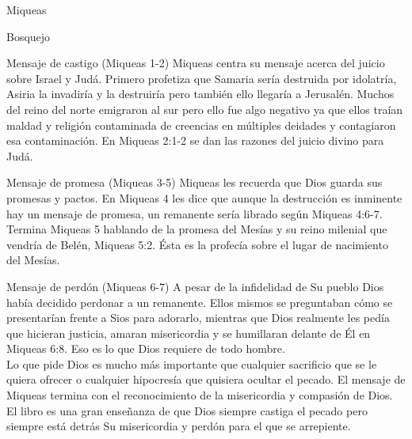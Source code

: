 \begin{section}{Miqueas}
\begin{enumerate}
	\end{enumerate}
	\begin{subsection}{Bosquejo}
		\begin{subsubsection}{Mensaje de castigo (Miqueas 1-2)}
			Miqueas centra su mensaje acerca del juicio sobre Israel y Judá. Primero profetiza que Samaria sería destruida por idolatría, Asiria la invadiría y la destruiría pero también ello llegaría a Jerusalén.
			\newpage
			Muchos del reino del norte emigraron al sur pero ello fue algo negativo ya que ellos traían maldad y religión contaminada de creencias en múltiples deidades y contagiaron esa contaminación. En Miqueas 2:1-2 se dan las razones del juicio divino para Judá. 
		\end{subsubsection}
		\begin{subsubsection}{Mensaje de promesa (Miqueas 3-5)}
			Miqueas les recuerda que Dios guarda sus promesas y pactos. En Miqueas 4 les dice que aunque la destrucción es inminente hay un mensaje de promesa, un remanente sería librado según Miqueas 4:6-7. Termina Miqueas 5 hablando de la promesa del Mesías y su reino milenial que vendría de Belén, Miqueas 5:2. Ésta es la profecía sobre el lugar de nacimiento del Mesías.
		\end{subsubsection}
		\begin{subsubsection}{Mensaje de perdón (Miqueas 6-7)}
			A pesar de la infidelidad de Su pueblo Dios había decidido perdonar a un remanente. Ellos mismos se preguntaban cómo se presentarían frente a Sios para adorarlo, mientras que Dios realmente les pedía que hicieran justicia, amaran misericordia y se humillaran delante de Él en Miqueas 6:8. Eso es lo que Dios requiere de todo hombre.\\
			Lo que pide Dios es mucho más importante que cualquier sacrificio que se le quiera ofrecer o cualquier hipocresía que quisiera ocultar el pecado. El mensaje de Miqueas termina con el reconocimiento de la misericordia y compasión de Dios. El libro es una gran enseñanza de que Dios siempre castiga el pecado pero siempre está detrás Su misericordia y perdón para el que se arrepiente.
		\end{subsubsection}
	\end{subsection}
\end{section}
%


